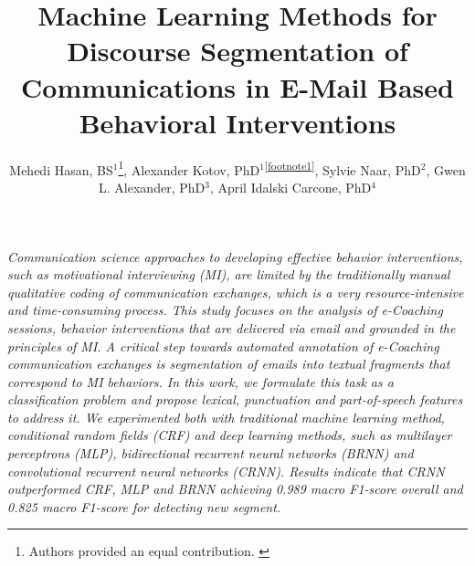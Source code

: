 \documentclass{amia}
\begin{document}
\title{Machine Learning Methods for Discourse Segmentation of Communications in E-Mail Based Behavioral Interventions}

\author{Mehedi Hasan, BS$^{1}$\footnote[1]{Authors provided an equal contribution. \label{footnote1}}, Alexander Kotov, PhD$^{1}$\textsuperscript{\ref{footnote1}}, Sylvie Naar, PhD$^{2}$, Gwen L. Alexander, PhD$^{3}$, April Idalski Carcone, PhD$^{4}$}


\maketitle

\textit{Communication science approaches to developing effective behavior interventions, such as motivational interviewing (MI), are limited by the traditionally manual qualitative coding of communication exchanges, which is a very resource-intensive and time-consuming process. This study focuses on the analysis of e-Coaching sessions, behavior interventions that are delivered via email and grounded in the principles of MI. A critical step towards automated annotation of e-Coaching communication exchanges is segmentation of emails into textual fragments that correspond to MI behaviors. In this work, we formulate this task as a classification problem and propose lexical, punctuation and part-of-speech features to address it. We experimented both with traditional machine learning method, conditional random fields (CRF) and deep learning methods, such as multilayer perceptrons (MLP), bidirectional recurrent neural networks (BRNN) and convolutional recurrent neural networks (CRNN). Results indicate that CRNN outperformed CRF, MLP and BRNN achieving 0.989 macro F1-score overall and 0.825 macro F1-score for detecting new segment.}
\end{document}
